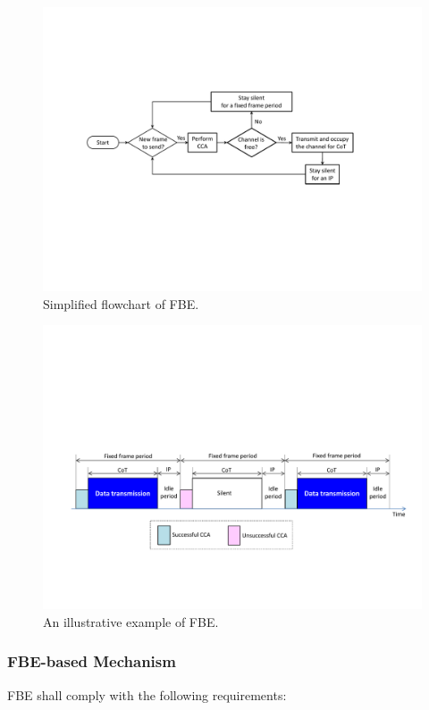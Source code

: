 \documentclass[journal,draftclsnofoot,12pt,onecolumn]{IEEEtran}
\begin{document}
\begin{figure}[!t]
\centering
\includegraphics[width=0.9\columnwidth]{figures2/FBE-flowchart}
\caption{Simplified flowchart of FBE.}
\label{figs:FBE-flowchart}
\end{figure}

\begin{figure}[!t]
\centering
\includegraphics[width=0.9\columnwidth]{figures2/FBE-example}
\caption{An illustrative example of FBE.}
\label{figs:FBE-example}
\end{figure}

\subsubsection{FBE-based Mechanism}

FBE shall comply with the following requirements:
\end{document}
